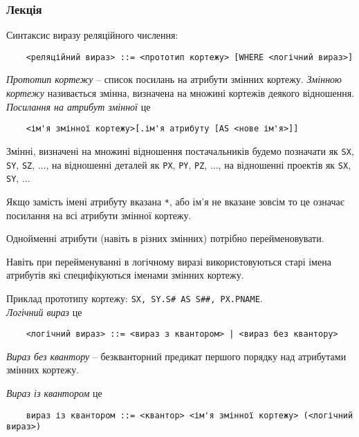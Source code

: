 \subsubsection{Лекція}
Синтаксис виразу реляційного числення: 

\begin{verbatim}
    <реляційний вираз> ::= <прототип кортежу> [WHERE <логічний вираз>]
\end{verbatim}
\textit{Прототип кортежу} -- список посилань на атрибути змінних кортежу. \textit{Змінною кортежу} називається змінна, визначена на множині кортежів деякого відношення. \textit{Посилання на атрибут змінної} це 
\begin{verbatim}
    <ім'я змінної кортежу>[.ім'я атрибуту [AS <нове ім'я>]]
\end{verbatim}
Змінні, визначені на множині відношення постачальників будемо позначати як \verb|SX|, \verb|SY|, \verb|SZ|, ..., на відношенні деталей як \verb|PX|, \verb|PY|, \verb|PZ|, ..., на відношенні проектів як \verb|SX|, \verb|SY|, ...

\begin{side_comment}
    Якщо замість імені атрибуту вказана \verb|*|, або ім'я не вказане зовсім то це означає посилання на всі атрибути змінної кортежу.
\end{side_comment}

\begin{side_comment}
    Однойменні атрибути (навіть в різних змінних) потрібно перейменовувати.
\end{side_comment}

\begin{side_comment}
    Навіть при перейменуванні в логічному виразі використовуються старі імена атрибутів які специфікуються іменами змінних кортежу.    
\end{side_comment}

Приклад прототипу кортежу: \verb|SX, SY.S# AS S##, PX.PNAME|. \\

\textit{Логічний вираз} це
\begin{verbatim}
    <логічний вираз> ::= <вираз з квантором> | <вираз без квантору>
\end{verbatim}

\textit{Вираз без квантору} -- безкванторний предикат першого порядку над атрибутами змінних кортежу.

\textit{Вираз із квантором} це
\begin{verbatim}
    вираз із квантором ::= <квантор> <ім'я змінної кортежу> (<логічний вираз>)
\end{verbatim}

